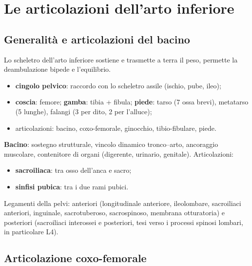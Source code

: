 \chapter{Le articolazioni dell'arto inferiore}

\section{Generalità e articolazioni del bacino}

Lo scheletro dell'arto inferiore sostiene e trasmette a terra il peso, permette la deambulazione
bipede e l'equilibrio.
\begin{itemize}
  \item \textbf{cingolo pelvico}: raccordo con lo scheletro assile (ischio, pube, ileo);
  \item \textbf{coscia}: femore; \textbf{gamba}: tibia + fibula; \textbf{piede}: tarso (7 ossa
    brevi), metatarso (5 lunghe), falangi (3 per dito, 2 per l'alluce);
  \item articolazioni: bacino, coxo-femorale, ginocchio, tibio-fibulare, piede.
\end{itemize}

\textbf{Bacino}: sostegno strutturale, vincolo dinamico tronco--arto, ancoraggio muscolare,
contenitore di organi (digerente, urinario, genitale). Articolazioni:
\begin{itemize}
  \item \textbf{sacroiliaca}: tra osso dell'anca e sacro;
  \item \textbf{sinfisi pubica}: tra i due rami pubici.
\end{itemize}
Legamenti della pelvi: anteriori (longitudinale anteriore, ileolombare, sacroiliaci anteriori,
inguinale, sacrotuberoso, sacrospinoso, membrana otturatoria) e posteriori (sacroiliaci interossei e
posteriori, tesi verso i processi spinosi lombari, in particolare L4).

\section{Articolazione coxo-femorale}

